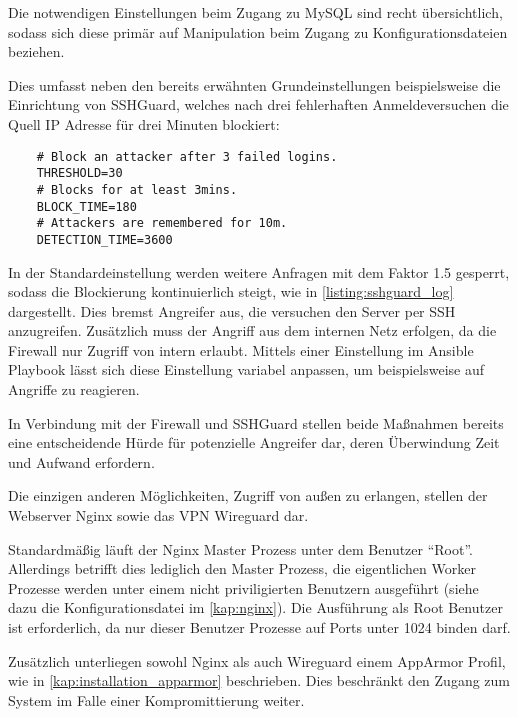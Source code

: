 Die notwendigen Einstellungen beim Zugang zu MySQL sind recht übersichtlich, sodass sich diese primär auf Manipulation beim Zugang zu Konfigurationsdateien beziehen.

Dies umfasst neben den bereits erwähnten Grundeinstellungen beispielsweise die Einrichtung von SSHGuard, welches nach drei fehlerhaften Anmeldeversuchen die Quell IP Adresse für drei Minuten blockiert:

\begin{verbatim}
	# Block an attacker after 3 failed logins.
	THRESHOLD=30
	# Blocks for at least 3mins.
	BLOCK_TIME=180
	# Attackers are remembered for 10m.
	DETECTION_TIME=3600
\end{verbatim}

In der Standardeinstellung werden weitere Anfragen mit dem Faktor 1.5 gesperrt, sodass die Blockierung kontinuierlich steigt, wie in \autoref{listing:sshguard_log} dargestellt. Dies bremst Angreifer aus, die versuchen den Server per SSH anzugreifen. Zusätzlich muss der Angriff aus dem internen Netz erfolgen, da die Firewall nur Zugriff von intern erlaubt. Mittels einer Einstellung im Ansible Playbook lässt sich diese Einstellung variabel anpassen, um beispielsweise auf Angriffe zu reagieren.

In Verbindung mit der Firewall und SSHGuard stellen beide Maßnahmen bereits eine entscheidende Hürde für potenzielle Angreifer dar, deren Überwindung Zeit und Aufwand erfordern.

Die einzigen anderen Möglichkeiten, Zugriff von außen zu erlangen, stellen der Webserver Nginx sowie das \ac{VPN} Wireguard dar.

Standardmäßig läuft der Nginx Master Prozess unter dem Benutzer \enquote{Root}. Allerdings betrifft dies lediglich den Master Prozess, die eigentlichen Worker Prozesse werden unter einem nicht priviligierten Benutzern ausgeführt (siehe dazu die Konfigurationsdatei im \autoref{kap:nginx}). Die Ausführung als Root Benutzer ist erforderlich, da nur dieser Benutzer Prozesse auf Ports unter 1024 binden darf. 

Zusätzlich unterliegen sowohl Nginx als auch Wireguard einem AppArmor Profil, wie in \autoref{kap:installation_apparmor} beschrieben. Dies beschränkt den Zugang zum System im Falle einer Kompromittierung weiter.

